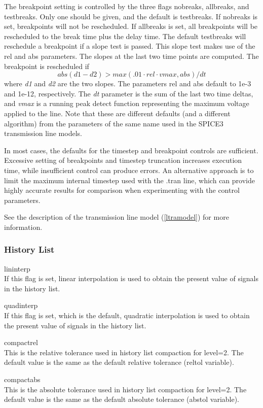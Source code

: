 The breakpoint setting is controlled by the three flags {\vt
nobreaks}, {\vt allbreaks}, and {\vt testbreaks}.  Only one should be
given, and the default is {\vt testbreaks}.  If {\vt nobreaks} is set,
breakpoints will not be rescheduled.  If {\vt allbreaks} is set, all
breakpoints will be rescheduled to the break time plus the delay time. 
The default {\vt testbreaks} will reschedule a breakpoint if a slope
test is passed.  This slope test makes use of the {\vt rel} and {\vt
abs} parameters.  The slopes at the last two time points are computed. 
The breakpoint is rescheduled if
\begin{displaymath}
abs(d1-d2) > max(.01{\cdot}rel{\cdot}vmax, abs)/dt
\end{displaymath}
where {\it d1} and {\it d2} are the two slopes.  The parameters {\vt
rel} and {\vt abs} default to 1e-3 and 1e-12, respectively.  The {\it
dt} parameter is the sum of the last two time deltas, and {\it vmax}
is a running peak detect function representing the maximum voltage
applied to the line.  Note that these are different defaults (and a
different algorithm) from the parameters of the same name used in the
SPICE3 transmission line models.

In most cases, the defaults for the timestep and breakpoint controls
are sufficient.  Excessive setting of breakpoints and timestep
truncation increases execution time, while insufficient control can
produce errors.  An alternative approach is to limit the maximum
internal timestep used with the {\vt .tran} line, which can provide
highly accurate results for comparison when experimenting with the
control parameters.

See the description of the transmission line model (\ref{ltramodel})
for more information.

\subsubsection{History List}

\begin{description}
\item{\vt lininterp}\\
If this flag is set, linear interpolation is used to obtain the
present value of signals in the history list.

\item{\vt quadinterp}\\
If this flag is set, which is the default, quadratic interpolation is
used to obtain the present value of signals in the history list.

\item{\vt compactrel}\\
This is the relative tolerance used in history list compaction for
{\vt level=2}.  The default value is the same as the {\WRspice}
default relative tolerance ({\vt reltol} variable).

\item{\vt compactabs}\\
This is the absolute tolerance used in history list compaction for
{\vt level=2}.  The default value is the same as the {\WRspice} default
absolute tolerance ({\vt abstol} variable).
\end{description}

